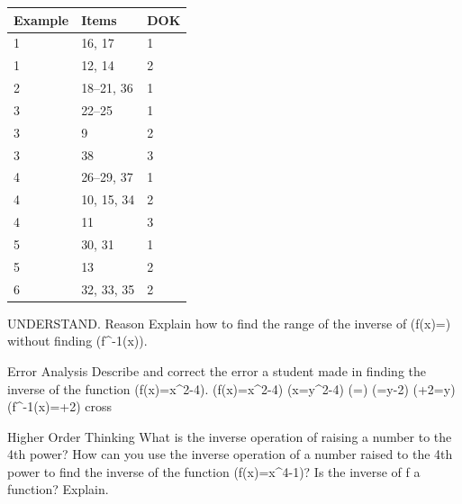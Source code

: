 \documentclass{article}
\newenvironment{item-analysis}{}{}      %
\newenvironment{practice}[2]{}{}        %
\newcommand{\answer}[1]{}               %
\newcommand{\te}[1]{}                   %
\begin{document}
\begin{item-analysis}
\begin{tabular}{lll}
\toprule
Example & Items & DOK \\
\midrule
1 & 16, 17 & 1 \\
1 & 12, 14 & 2 \\
2 & 18--21, 36 & 1 \\
3 & 22--25 & 1 \\
3 & 9 & 2 \\
3 & 38 & 3 \\
4 & 26--29, 37 & 1 \\
4 & 10, 15, 34 & 2 \\
4 & 11 & 3 \\
5 & 30, 31 & 1 \\
5 & 13 & 2 \\
6 & 32, 33, 35 & 2 \\
\bottomrule
\end{tabular}
\end{item-analysis}
\begin{practice}{9}{2}
UNDERSTAND. Reason Explain how to find the range of the inverse of (f(x)=) without finding (f^{-1}(x)).
\answer{The range of (f^{-1}(x)) is the same as the domain of (f(x)). The domain of (f(x)=\sqrt{2x-3}) is (2x-3\geq0) or (x\geq\frac32). So, the range of (f^{-1}(x)) is (x\geq\frac32).}
\te{Answer printed on PDF page 84. Printed range expressed with x rather than y.}
\end{practice}
\begin{practice}{10}{2}
Error Analysis Describe and correct the error a student made in finding the inverse of the function (f(x)=x^2-4).
(f(x)=x^2-4)
(x=y^2-4)
(=)
(=y-2)
(+2=y)
(f^{-1}(x)=+2) cross
\answer{The student took the square root of both sides before adding 4 to both sides. The inverse is (f^{-1}(x)=\sqrt{x+4}).}
\te{Answer printed on PDF page 84. Printed answer selects the positive branch without stating a restriction; for the unrestricted original relation, (y=\pm\sqrt{x+4}).}
\end{practice}
\begin{practice}{11}{3}
Higher Order Thinking What is the inverse operation of raising a number to the 4th power? How can you use the inverse operation of a number raised to the 4th power to find the inverse of the function (f(x)=x^4-1)? Is the inverse of f a function? Explain.
\answer{The inverse of a number raised to the 4th power is the 4th root of a number. To find the inverse of (f(x)), add 1 to both sides. To undo x raised to the 4th power, take the 4th root of both sides. The inverse is (f^{-1}(x)=\sqrt[4]{x+1}). The inverse is not a function because each independent value is not paired with only one dependent value.}
\te{Answer printed on PDF page 84. Printed formula omits the negative branch although the explanation refers to both branches; likely (y=\pm\sqrt[4]{x+1}).}
\end{practice}
\end{document}

